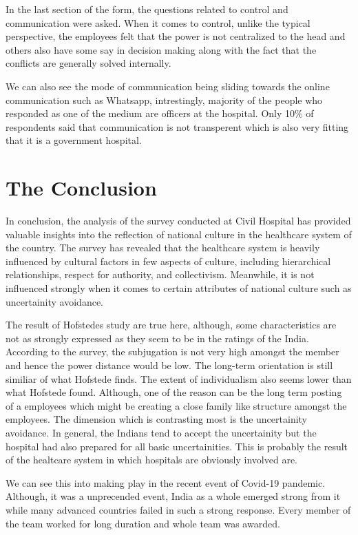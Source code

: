 \documentclass{article}
\begin{document}
In the last section of the form, the questions related to control and communication were asked. When it comes to control, unlike the typical perspective, the employees felt that the power is not centralized to the head and others also have some say in decision making along with the fact that the conflicts are generally solved internally.

We can also see the mode of communication being sliding towards the online communication such as Whatsapp, intrestingly, majority of the people who responded as one of the medium are officers at the hospital. Only 10\% of respondents said that communication is not transperent which is also very fitting that it is a government hospital.

\section{The Conclusion}

In conclusion, the analysis of the survey conducted at Civil Hospital has provided valuable insights into the reflection of national culture in the healthcare system of the country. The survey has revealed that the healthcare system is heavily influenced by cultural factors in few aspects of culture, including hierarchical relationships, respect for authority, and collectivism. Meanwhile, it is not influenced strongly when it comes to certain attributes of national culture such as uncertainity avoidance.

The result of Hofstedes study are true here, although, some characteristics are not as strongly expressed as they seem to be in the ratings of the India. According to the survey, the subjugation is not very high amongst the member and hence the power distance would be low. The long-term orientation is still similiar of what Hofstede finds. The extent of individualism also seems lower than what Hofstede found. Although, one of the reason can be the long term posting of a employees which might be creating a close family like structure amongst the employees. The dimension which is contrasting most is the uncertainity avoidance. In general, the Indians tend to accept the uncertainity but the hospital had also prepared for all basic uncertainities. This is probably the result of the healtcare system in which hospitals are obviously involved are.

We can see this into making play in the recent event of Covid-19 pandemic. Although, it was a unprecended event, India as a whole emerged strong from it while many advanced countries failed in such a strong response. Every member of the team worked for long duration and whole team was awarded.
\end{document}
